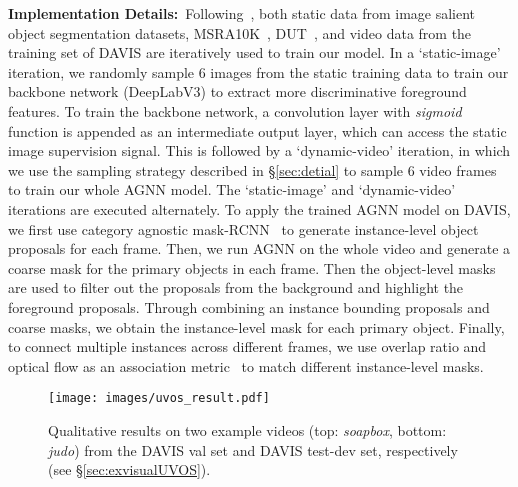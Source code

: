 \documentclass[10pt,twocolumn,letterpaper]{article}
\begin{document}
\noindent\textbf{Implementation Details:}~Following~\cite{DBLP:conf/cvpr/PerazziKBSS17,Song_2018_ECCV}, both static data from image salient object segmentation datasets, {MSRA10K}~\cite{cheng2015global}, {DUT}~\cite{DBLP:conf/cvpr/YangZLRY13}, and video data from the training set of DAVIS  are iteratively used to train our model. In a `static-image' iteration, we randomly sample 6 images from the static training data to train our backbone network (DeepLabV3) to extract more discriminative foreground  features. To train the backbone network,  a  convolution layer with \textit{sigmoid} function is appended as an intermediate output layer, which can access the static image supervision signal. This is followed by a `dynamic-video' iteration, in which we use the sampling strategy described in \S\ref{sec:detial} to sample 6 video frames to train our whole AGNN model.
The `static-image' and `dynamic-video' iterations are executed alternately. To apply the trained AGNN model on DAVIS, we first use category agnostic mask-RCNN~\cite{he2017mask} to generate instance-level object proposals for each frame. Then, we run AGNN on the whole video and generate a coarse mask for the primary objects in each frame. Then the object-level masks are used to filter out the proposals from the background and highlight the foreground proposals. Through combining an instance bounding proposals and coarse masks, we obtain the instance-level mask for each primary object. Finally, to connect multiple instances across different frames, we use overlap ratio and optical flow as an association metric~\cite{luiten2018premvos} to match different instance-level masks.

\begin{figure*}[t]
	\centering
	\texttt{[image: images/uvos\_result.pdf]}
	\vspace*{-9pt}	
	\caption{\small Qualitative results on two example videos (top: \textit{soapbox}, bottom: \textit{judo}) from the DAVIS val set and DAVIS test-dev set, respectively (see \S\ref{sec:exvisualUVOS}). }
	\label{fig:uvos}	
	\vspace*{-18pt}	
\end{figure*}

\vspace*{-12pt}
\end{document}
